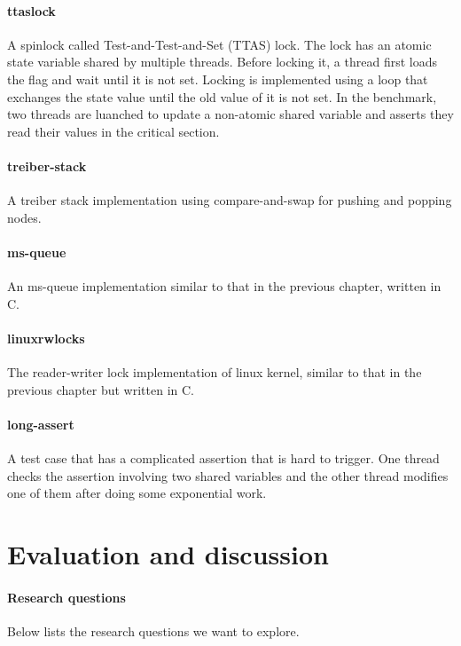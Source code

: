 \paragraph{ttaslock} A spinlock called Test-and-Test-and-Set (TTAS) lock. The lock has an atomic state variable shared by multiple threads. Before locking it, a thread first loads the flag and wait until it is not set. Locking is implemented using a loop that exchanges the state value until the old value of it is not set. In the benchmark, two threads are luanched to update a non-atomic shared variable and asserts they read their values in the critical section.

\paragraph{treiber-stack} A treiber stack\cite{treiber-stack} implementation using compare-and-swap for pushing and popping nodes.

\paragraph{ms-queue} An ms-queue implementation similar to that in the previous chapter, written in C.

\paragraph{linuxrwlocks} The reader-writer lock implementation of linux kernel, similar to that in the previous chapter but written in C.



\paragraph{long-assert} A test case that has a complicated assertion that is hard to trigger. One thread checks the assertion involving two shared variables and the other thread modifies one of them after doing some exponential work.

\section{Evaluation and discussion}

\paragraph*{Research questions} Below lists the research questions we want to explore.

